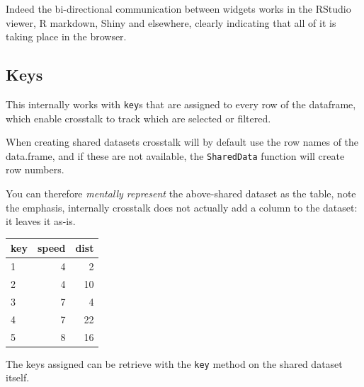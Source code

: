 \documentclass[
  10pt,
]{krantz}
\makeatletter
\newenvironment{Shaded}{\begin{snugshade}}{\end{snugshade}}
\newcommand{\CommentTok}[1]{\textcolor[rgb]{0.37,0.37,0.37}{\textit{#1}}}
\newcommand{\DecValTok}[1]{\textcolor[rgb]{0.06,0.06,0.06}{#1}}
\newcommand{\KeywordTok}[1]{\textcolor[rgb]{0.27,0.27,0.27}{\textbf{#1}}}
\newcommand{\NormalTok}[1]{#1}
\newcommand{\OperatorTok}[1]{\textcolor[rgb]{0.43,0.43,0.43}{\textbf{#1}}}
\newcommand{\StringTok}[1]{\textcolor[rgb]{0.5,0.5,0.5}{#1}}
\newenvironment{kframe}{%
\medskip{}
\setlength{\fboxsep}{.8em}
 \def\at@end@of@kframe{}%
 \ifinner\ifhmode%
  \def\at@end@of@kframe{\end{minipage}}%
  \begin{minipage}{\columnwidth}%
 \fi\fi%
 \def\FrameCommand##1{\hskip\@totalleftmargin \hskip-\fboxsep
 \colorbox{shadecolor}{##1}\hskip-\fboxsep
     \hskip-\linewidth \hskip-\@totalleftmargin \hskip\columnwidth}%
 \MakeFramed {\advance\hsize-\width
   \@totalleftmargin\z@ \linewidth\hsize
   \@setminipage}}%
 {\par\unskip\endMakeFramed%
 \at@end@of@kframe}
\renewenvironment{Shaded}{\begin{kframe}}{\end{kframe}}
\makeatother
\begin{document}
Indeed the bi-directional communication between widgets works in the RStudio viewer, R markdown, Shiny and elsewhere, clearly indicating that all of it is taking place in the browser.

\hypertarget{linking-widgets-keys}{%
\subsection{Keys}\label{linking-widgets-keys}}

This internally works with \texttt{key}s that are assigned to every row of the dataframe, which enable crosstalk to track which are selected or filtered.

When creating shared datasets crosstalk will by default use the row names of the data.frame, and if these are not available, the \texttt{SharedData} function will create row numbers.

\begin{Shaded}
\end{Shaded}

You can therefore \emph{mentally represent} the above-shared dataset as the table, note the emphasis, internally crosstalk does not actually add a column to the dataset: it leaves it as-is.

\begin{tabular}{l|r|r}
\hline
key & speed & dist\\
\hline
1 & 4 & 2\\
\hline
2 & 4 & 10\\
\hline
3 & 7 & 4\\
\hline
4 & 7 & 22\\
\hline
5 & 8 & 16\\
\hline
\end{tabular}

The keys assigned can be retrieve with the \texttt{key} method on the shared dataset itself.

\begin{Shaded}
\end{Shaded}
\end{document}
